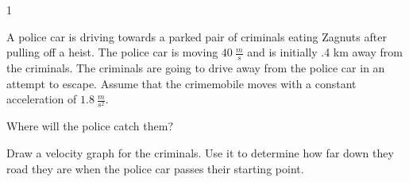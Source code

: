 
\AddToShipoutPicture*{\BackgroundPic}

\addtocounter {ProbNum} {1}

 
{\bf \Large{}} A police car is driving towards a parked pair of criminals eating Zagnuts after pulling off a heist. The police car is moving ${40~\tfrac{m}{s}}$ and is initially .4 km away from the criminals. The criminals are going to drive away from the police car in an attempt to escape.  Assume that the crimemobile moves with a constant acceleration of ${1.8~\tfrac{m}{s^2}}$. 

\bigskip
Where will the police catch them?

\vfill

Draw a velocity graph for the criminals.  Use it to determine how far down they road they are when the police car passes their starting point.
\vfill

\newpage